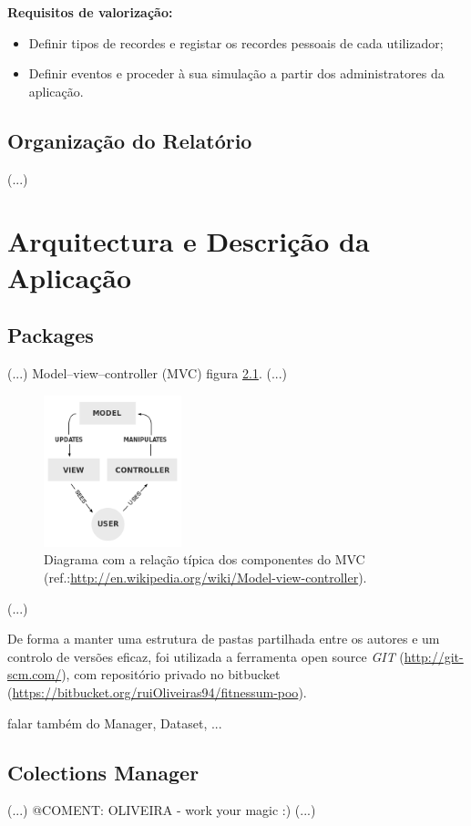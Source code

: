 \documentclass[a4paper,10pt]{report}
\begin{document}
\textbf{Requisitos de valorização:}
\begin{itemize}
\item Definir tipos de recordes e registar os recordes pessoais de cada utilizador;
\item Definir eventos e proceder à sua simulação a partir dos administratores da aplicação.
\end{itemize}

\section{Organização do Relatório}
\label{sec:org}
(...)

\chapter{Arquitectura e Descrição da Aplicação}
\label{cap:arq}
\section{Packages}
\label{sec:packages}
(...)
Model–view–controller (MVC) figura \ref{fig:mvc}.
(...)
\begin{figure}
\centering
\includegraphics[width=4cm]{MVC-Process.png}
\caption{Diagrama com a relação típica dos componentes do MVC (ref.:\url{http://en.wikipedia.org/wiki/Model-view-controller}).}
\label{fig:mvc}
\end{figure}
(...)

De forma a manter uma estrutura de pastas partilhada entre os autores e um controlo de versões eficaz, 
foi utilizada a ferramenta open source \emph{GIT} (\url{http://git-scm.com/}), 
com repositório privado no bitbucket (\url{https://bitbucket.org/ruiOliveiras94/fitnessum-poo}).

falar também do Manager, Dataset, ...

\section{Colections Manager}
\label{sec:manager}
(...)
@COMENT: OLIVEIRA - work your magic :)
(...)
\end{document}
